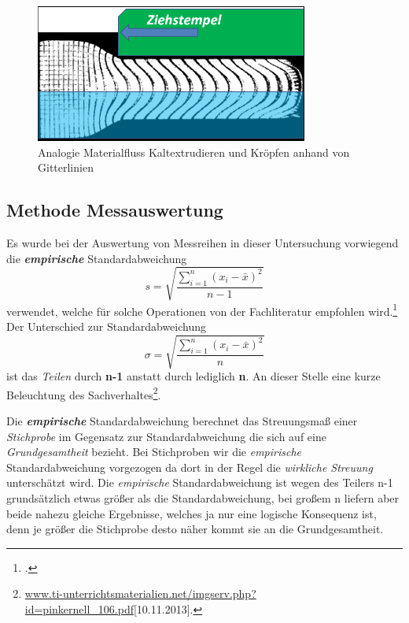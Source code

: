 \documentclass[12pt,a4paper,parskip]{scrartcl}
\begin{document}
\begin{figure}[hbtp]
\centering
\includegraphics[width=0.8\textwidth]{materialflussvergleich}
\caption{Analogie Materialfluss Kaltextrudieren und  Kröpfen anhand von Gitterlinien}
\label{fig:extr}
\end{figure}









  











\subsection{Methode Messauswertung}
Es wurde bei der Auswertung von Messreihen in dieser Untersuchung vorwiegend die \textbf{\emph{empirische}} Standardabweichung 
\begin{equation}s= \sqrt{\frac{\sum \limits_{i=1}^n (x_i - \bar{x})^2}{n-1}}\end{equation}  verwendet, welche für solche Operationen von der Fachliteratur empfohlen wird.\footcite[Vgl.][301]{mf} Der Unterschied zur Standardabweichung \begin{equation} \sigma = \sqrt{\frac{\sum \limits_{i=1}^n (x_i - \bar{x})^2}{n}}\end{equation}  ist das \emph{Teilen} durch \textbf{n-1} anstatt durch lediglich \textbf{n}.
 An dieser Stelle eine kurze Beleuchtung des Sachverhaltes\footnote{\url{www.ti-unterrichtsmaterialien.net/imgserv.php?id=pinkernell_106.pdf}[10.11.2013].‎}.



Die \textbf{\emph{empirische}} Standardabweichung berechnet das Streuungsmaß einer \emph{Stichprobe} im Gegensatz zur Standardabweichung die sich auf eine \emph{Grundgesamtheit} bezieht. Bei Stichproben wir die \emph{empirische} Standardabweichung vorgezogen da dort in der Regel die \emph{wirkliche Streuung} unterschätzt wird. Die \emph{empirische} Standardabweichung ist wegen des Teilers n-1 grundsätzlich etwas größer als die Standardabweichung, bei großem n liefern aber beide nahezu gleiche Ergebnisse, welches ja nur eine logische Konsequenz ist, denn je größer die Stichprobe desto näher kommt sie an die Grundgesamtheit.
\end{document}
